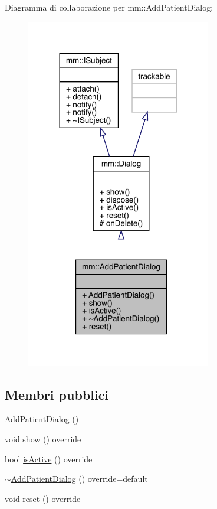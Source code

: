 Diagramma di collaborazione per mm\+:\+:Add\+Patient\+Dialog\+:
\nopagebreak
\begin{figure}[H]
\begin{center}
\leavevmode
\includegraphics[width=228pt]{d5/d54/classmm_1_1_add_patient_dialog__coll__graph}
\end{center}
\end{figure}
\subsection*{Membri pubblici}
\begin{DoxyCompactItemize}
\item 
\mbox{\hyperlink{classmm_1_1_add_patient_dialog_ad81abcf242a1c103f76c1fd4c6406b57}{Add\+Patient\+Dialog}} ()
\item 
void \mbox{\hyperlink{classmm_1_1_add_patient_dialog_a0247912794984eb19c43842ab9037708}{show}} () override
\item 
bool \mbox{\hyperlink{classmm_1_1_add_patient_dialog_a459a8acbec1c8a5a87e00f23402d3b5d}{is\+Active}} () override
\item 
\mbox{\hyperlink{classmm_1_1_add_patient_dialog_a7c4f7d1dd42d139bffbe54bb478b1f82}{$\sim$\+Add\+Patient\+Dialog}} () override=default
\item 
void \mbox{\hyperlink{classmm_1_1_add_patient_dialog_a64c8c2ea3b1c69a858f4eaec1854270a}{reset}} () override
\end{DoxyCompactItemize}
